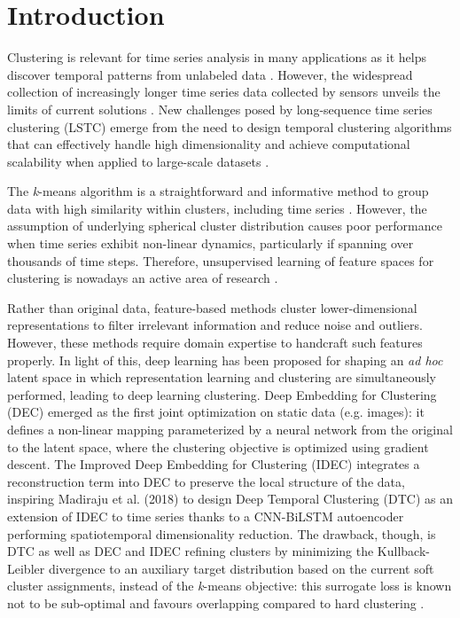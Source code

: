 \documentclass[times, review, 10pt]{elsarticle}
\begin{document}


\section{Introduction}
Clustering is relevant for time series analysis in many applications as it helps discover temporal patterns from unlabeled data \cite{liao2005clustering,lee2024deep}. However, the widespread collection of increasingly longer time series data collected by sensors unveils the limits of current solutions \cite{el2023constrained}. New challenges posed by long-sequence time series clustering (LSTC) emerge from the need to design temporal clustering algorithms that can effectively handle high dimensionality and achieve computational scalability when applied to large-scale datasets \cite{li2021multivariate}.

The \textit{k}-means algorithm is a straightforward and informative method to group data with high similarity within clusters, including time series \cite{yang2017towards,zhang2025structured}. However, the assumption of underlying spherical cluster distribution causes poor performance when time series exhibit non-linear dynamics, particularly if spanning over thousands of time steps. Therefore, unsupervised learning of feature spaces for clustering is nowadays an active area of research \cite{ren2025deep}.

Rather than original data, feature-based methods cluster lower-dimensional representations to filter irrelevant information and reduce noise and outliers. However, these methods require domain expertise to handcraft such features properly. In light of this, deep learning has been proposed for shaping an \emph{ad hoc} latent space in which representation learning and clustering are simultaneously performed, leading to deep learning clustering. Deep Embedding for Clustering (DEC) \cite{xie2016unsupervised} emerged as the first joint optimization on static data (e.g. images): it defines a non-linear mapping parameterized by a neural network from the original to the latent space, where the clustering objective is optimized using gradient descent. The Improved Deep Embedding for Clustering (IDEC) \cite{guo2017improved} integrates a reconstruction term into DEC to preserve the local structure of the data, inspiring Madiraju et al. (2018) \cite{madiraju2018deep} to design Deep Temporal Clustering (DTC) as an extension of IDEC to time series thanks to a CNN-BiLSTM autoencoder performing spatiotemporal dimensionality reduction. The drawback, though, is DTC as well as DEC and IDEC refining clusters by minimizing the Kullback-Leibler divergence to an auxiliary target distribution based on the current soft cluster assignments, instead of the \textit{k}-means objective: this surrogate loss is known not to be sub-optimal and favours overlapping compared to hard clustering \cite{gao2020deep}.
\end{document}
